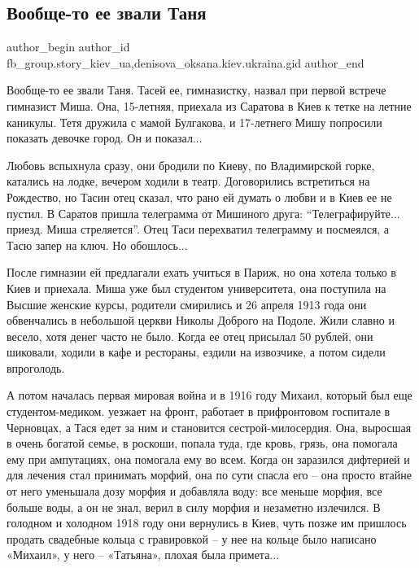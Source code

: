  
 
 
 
 
 
\subsection{Вообще-то ее звали Таня}
\label{sec:14_02_2022.fb.fb_group.story_kiev_ua.1.tanja_bulgakov}
 
\ifcmt
 author_begin
   author_id fb_group.story_kiev_ua,denisova_oksana.kiev.ukraina.gid
 author_end
\fi

Вообще-то ее звали Таня. Тасей ее, гимназистку, назвал при первой встрече
гимназист Миша. Она, 15-летняя, приехала из Саратова в Киев к тетке на летние
каникулы. Тетя дружила с мамой Булгакова, и 17-летнего Мишу попросили показать
девочке город. Он и показал...


Любовь вспыхнула сразу, они бродили по Киеву, по Владимирской горке, катались
на лодке, вечером ходили в театр. Договорились встретиться на Рождество, но
Тасин отец сказал, что рано ей думать о любви и в Киев ее не пустил. В Саратов
пришла телеграмма от Мишиного друга: \enquote{Телеграфируйте... приезд. Миша
стреляется}. Отец Таси перехватил телеграмму и посмеялся, а Тасю запер на ключ.
Но обошлось...

После гимназии ей предлагали ехать учиться в Париж, но она хотела только в Киев
и приехала. Миша уже был студентом университета, она поступила на Высшие
женские курсы, родители смирились и 26 апреля 1913 года они обвенчались в
небольшой церкви Николы Доброго на Подоле. Жили славно и весело, хотя денег
часто не было. Когда ее  отец присылал 50 рублей, они шиковали, ходили в кафе и
рестораны, ездили на извозчике, а потом сидели впроголодь.

А потом началась первая мировая война и в 1916 году Михаил, который был еще
студентом-медиком. уезжает на фронт, работает в прифронтовом госпитале в
Черновцах, а Тася едет за ним и становится сестрой-милосердия. Она, выросшая в
очень богатой семье, в роскоши, попала туда, где кровь, грязь, она помогала ему
при ампутациях, она помогала ему во всем. Когда он заразился дифтерией и для
лечения стал принимать морфий, она по сути спасла его – она просто втайне от
него уменьшала дозу морфия и добавляла воду: все меньше морфия, все больше
воды, а он не знал, верил в силу морфия и незаметно излечился. В голодном и
холодном 1918 году они вернулись в Киев, чуть позже им пришлось продать
свадебные кольца с гравировкой – у нее на кольце было написано «Михаил», у него
– «Татьяна», плохая была примета...

